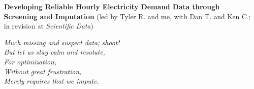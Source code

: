 \documentclass{article}
\begin{document}
\vspace{0.75cm}

\noindent
\textbf{Developing Reliable Hourly Electricity Demand Data through Screening and Imputation} (led by Tyler R. and me, with Dan T. and Ken C.; in revision at \textit{Scientific Data})\\

\vspace{0.25cm}

{\large
\noindent
\textit{Much missing and suspect data; shoot!\\
But let us stay calm and resolute,\\
\null \hspace{0.5cm} For optimization,\\
\null \hspace{0.5cm} Without great frustration,\\
Merely requires that we impute.}
}
\end{document}

